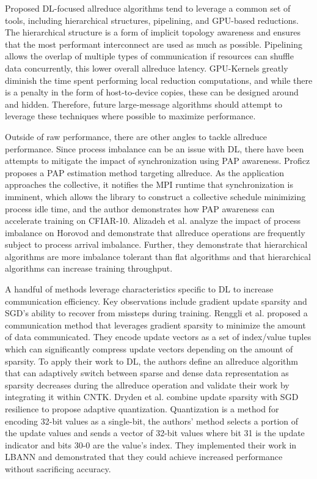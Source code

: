 Proposed \gls{DL}-focused allreduce algorithms tend to leverage a common set of tools, including hierarchical structures, pipelining, and \gls{GPU}-based reductions.
The hierarchical structure is a form of implicit topology awareness and ensures that the most performant interconnect are used as much as possible.
Pipelining allows the overlap of multiple types of communication if resources can shuffle data concurrently, this lower overall allreduce latency. 
\gls{GPU}-Kernels greatly diminish the time spent performing local reduction computations, and while there is a penalty in the form of host-to-device copies, these can be designed around and hidden.
Therefore, future large-message algorithms should attempt to leverage these techniques where possible to maximize performance. 

Outside of raw performance, there are other angles to tackle allreduce performance.
Since process imbalance can be an issue with \gls{DL}, there have been attempts to mitigate the impact of synchronization using \gls{PAP} awareness.
Proficz proposes a \gls{PAP} estimation method \cite{Proficz2018ImprvAllReduceForImbPAP} targeting allreduce.
As the application approaches the collective, it notifies the \gls{MPI} runtime that synchronization is imminent, which allows the library to construct a collective schedule minimizing process idle time, and the author demonstrates how \gls{PAP} awareness can accelerate training on CFIAR-10.
Alizadeh et al. \cite{Alizadeh2022PAPCollDL} analyze the impact of process imbalance on Horovod and demonstrate that allreduce operations are frequently subject to process arrival imbalance. 
Further, they demonstrate that hierarchical algorithms are more imbalance tolerant than flat algorithms and that hierarchical algorithms can increase training throughput.

A handful of methods leverage characteristics specific to \gls{DL} to increase communication efficiency.
Key observations include gradient update sparsity and \gls{SGD}'s ability to recover from missteps during training.
Renggli et al. \cite{Renggli2019SparCML} proposed a communication method that leverages gradient sparsity to minimize the amount of data communicated.
They encode update vectors as a set of index/value tuples which can significantly compress update vectors depending on the amount of sparsity.
To apply their work to \gls{DL}, the authors define an allreduce algorithm that can adaptively switch between sparse and dense data representation as sparsity decreases during the allreduce operation and validate their work by integrating it within \gls{CNTK}.
Dryden et al. \cite{Dryden2016CommQuantDPDNN} combine update sparsity with \gls{SGD} resilience to propose adaptive quantization. 
Quantization is a method for encoding 32-bit values as a single-bit, the authors' method selects a portion of the update values and sends a vector of 32-bit values where bit 31 is the update indicator and bits 30-0 are the value's index.
They implemented their work in LBANN and demonstrated that they could achieve increased performance without sacrificing accuracy.

